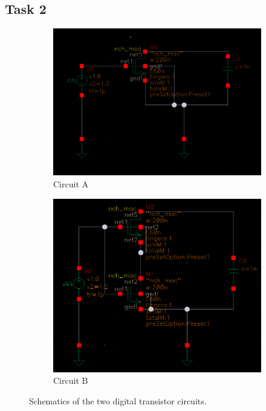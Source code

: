 \documentclass[onecolumn]{article}
\begin{document}
\subsection{Task 2}
\begin{figure}[h!]
  \centering
  \begin{subfigure}{.75\textwidth}
    \centering
    \includegraphics[width=1\linewidth]{A.png}
    \caption{Circuit A}
    \label{fig:sub5}
  \end{subfigure}
  \begin{subfigure}{.75\textwidth}
    \centering
    \includegraphics[width=1\linewidth]{B.png}
    \caption{Circuit B}
    \label{fig:sub6}
  \end{subfigure}
  \caption{Schematics of the two digital transistor circuits.}
  \label{fig:3}
\end{figure}
\end{document}
